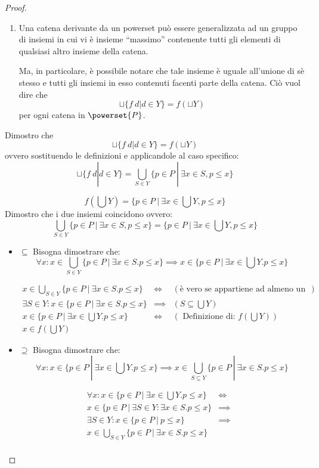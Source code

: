 \begin{proof}
\begin{enumerate}
    
  \item Una catena derivante da un powerset può essere generalizzata ad un
    gruppo di insiemi in cui  vi è insieme ``massimo'' contenente tutti gli
    elementi di qualsiasi altro insieme della catena.

	

    Ma, in particolare, è possibile notare che tale insieme è uguale all'unione
    di sè stesso e tutti gli insiemi in esso contenuti facenti parte della
    catena. Ciò vuol dire che
    $$
    \sqcup\{f\ d | d \in Y\} = f(\sqcup Y)
    $$
    per ogni catena in $\powerset{P}$.
\end{enumerate}

Dimostro che 
$$
\sqcup\{f\ d | d \in Y\} = f(\sqcup Y)
$$
ovvero sostituendo le definizioni e applicandole al caso specifico:
$$
\sqcup\{f\ d | d \in Y\} = \bigcup_{S \in Y} \{p \in P\ |\ \exists x \in S, p \leq x\}
$$

$$
f(\bigcup Y) = \{p \in P\ |\ \exists x \in \bigcup Y, p \leq x\}
$$
Dimostro che i due insiemi coincidono ovvero:
$$
\bigcup_{S \in Y} \{p \in P\ |\ \exists x \in S, p \leq x\} =  \{p \in P\ |\ \exists x \in \bigcup Y, p \leq x\}
$$
\begin{itemize}
	\item $\boxed{\subseteq}$ Bisogna dimostrare che:
	$$
	\forall x : x \in \bigcup_{S \in Y} \{p \in P\ |\ \exists x \in S. p \leq x\} \implies x \in \{p \in P\ |\ \exists x \in \bigcup Y. p \leq x\}
	$$
	
	$$
	\begin{array}{llr}
	x \in \bigcup_{S \in Y} \{p \in P\ |\ \exists x \in S. p \leq x\} & \iff & (\text{è vero se appartiene ad almeno un sottinsieme di Y})\\
	\exists S \in Y: x \in \{p \in P\ |\ \exists x \in S. p \leq x\} & \implies & (S \subseteq \bigcup Y)\\
	x \in \{p \in P\ |\ \exists x \in \bigcup Y. p \leq x \} & \iff & (\text{ Definizione di: } f(\bigcup Y)) \\
	x \in f(\bigcup Y)
	\end{array}
	$$
	\item $\boxed{\supseteq}$ Bisogna dimostrare che:
	$$
	\forall x : x \in \{p \in P\ |\ \exists x \in \bigcup Y. p \leq x\} \implies x \in 
	\bigcup_{S \subseteq Y} \{p \in P\ |\ \exists x \in S. p \leq x\} 
	$$ 
	
	$$
	\begin{array}{lll}
	\forall x : x \in \{p \in P\ |\ \exists x \in \bigcup Y. p \leq x\} & \iff & \\
	x \in \{p \in P\ |\ \exists S \in Y: \exists x \in S. p \leq x \} & \implies & \\
	\exists S \in Y : x \in \{p \in P\ |\ p \leq x \} & \implies & \\
	x \in \bigcup_{S \in Y} \{p \in P\ |\ \exists x \in S. p \leq x\} & & \\
	
	\end{array}
	$$
\end{itemize}



\end{proof}

\let\powerset\undefined
